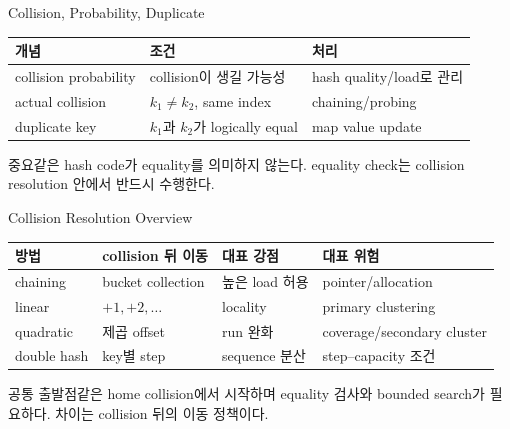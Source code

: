 \begin{frame}{Collision, Probability, Duplicate}
\small\centering\begin{tabular}{lll}\toprule
개념&조건&처리\\\midrule
collision probability&collision이 생길 가능성&hash quality/load로 관리\\
actual collision&$k_1\ne k_2$, same index&chaining/probing\\
duplicate key&$k_1$과 $k_2$가 logically equal&map value update\\\bottomrule
\end{tabular}
\begin{alertblock}{중요}같은 hash code가 equality를 의미하지 않는다. equality check는 collision resolution 안에서 반드시 수행한다.\end{alertblock}
\end{frame}
\begin{frame}{Collision Resolution Overview}
\footnotesize\centering
\setlength{\tabcolsep}{4pt}
\begin{tabular}{llll}\toprule
방법&collision 뒤 이동&대표 강점&대표 위험\\\midrule
chaining&bucket collection&높은 load 허용&pointer/allocation\\
linear&$+1,+2,\ldots$&locality&primary clustering\\
quadratic&제곱 offset&run 완화&coverage/secondary cluster\\
double hash&key별 step&sequence 분산&step--capacity 조건\\\bottomrule
\end{tabular}
\begin{block}{공통 출발점}같은 home collision에서 시작하며 equality 검사와 bounded search가 필요하다. 차이는 collision 뒤의 이동 정책이다.\end{block}
\end{frame}
